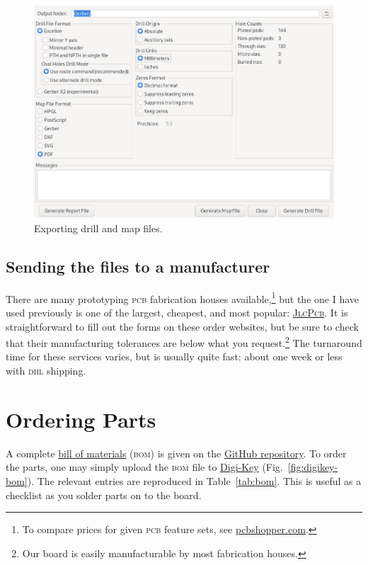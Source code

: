 \documentclass[12pt]{article}
\begin{document}
\begin{figure}
  \centering
  \includegraphics[width=\linewidth]{mapdrill}
  \caption{Exporting drill and map files.}\label{fig:mapdrill}
\end{figure}

\subsection{Sending the files to a manufacturer}

There are many prototyping \textsc{pcb} fabrication houses
available,\footnote{To compare prices for given \textsc{pcb} feature sets, see
\url{pcbshopper.com}.} but the one I have used previously is one of the largest,
cheapest, and most popular: \href{https://jlcpcb.com}{\textsc{JlcPcb}}. It is
straightforward to fill out the forms on these order websites, but be sure to
check that their manufacturing tolerances are below what you
request.\footnote{Our board is easily manufacturable by most fabrication
houses.} The turnaround time for these services varies, but is usually quite
fast: about one week or less with \textsc{dhl} shipping.

\section{Ordering Parts}

A complete
\href{https://github.com/lucasilling/AJP_TimeDelay_Git/blob/master/Digikey_BOM.csv}{bill
of materials} (\textsc{bom}) is given on the
\href{https://github.com/lucasilling/AJP_TimeDelay_Git}{GitHub repository}. To
order the parts, one may simply upload the \textsc{bom} file to
\href{https://www.digikey.com/bom}{Digi-Key} (Fig.~\ref{fig:digikey-bom}). The
relevant entries are reproduced in Table~\ref{tab:bom}. This is useful as a
checklist as you solder parts on to the board.
\end{document}
